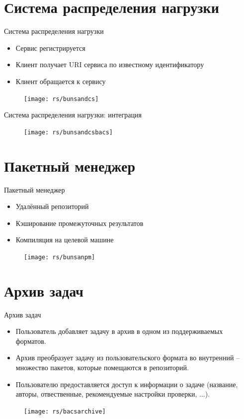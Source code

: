 \documentclass[xetex,mathserif,serif,10pt]{beamer}
\newenvironment{sframe}[2]{\section{#1}\begin{frame}[label=#2]{#1}}{\end{frame}}
\begin{document}
    \begin{sframe}{Система распределения нагрузки}{dcs}
        \begin{itemize}
            \item Сервис регистрируется
            \item Клиент получает URI сервиса по известному идентификатору
            \item Клиент обращается к сервису
        \end{itemize}
        \begin{figure}
            \centering
            \texttt{[image: rs/bunsandcs]}
        \end{figure}
    \end{sframe}

    \begin{frame}{Система распределения нагрузки: интеграция}
        \begin{figure}
            \centering
            \texttt{[image: rs/bunsandcsbacs]}
        \end{figure}
    \end{frame}

    \begin{sframe}{Пакетный менеджер}{bunsanpm}
        \begin{itemize}
            \item Удалённый репозиторий
            \item Кэширование промежуточных результатов
            \item Компиляция на целевой машине
        \end{itemize}
        \begin{figure}
            \centering
            \texttt{[image: rs/bunsanpm]}
        \end{figure}
    \end{sframe}

    \begin{sframe}{Архив задач}{bacsarchive}
        \begin{itemize}
            \item Пользователь добавляет задачу в архив в одном из поддерживаемых форматов.
            \item Архив преобразует задачу из пользовательского формата во внутренний --
                множество пакетов, которые помещаются в репозиторий.
            \item Пользователю предоставляется доступ к информации о задаче
                (название, авторы, отвественные, рекомендуемые настройки проверки, ...).
        \end{itemize}
        \begin{figure}
            \centering
            \texttt{[image: rs/bacsarchive]}
        \end{figure}
    \end{sframe}
\end{document}
